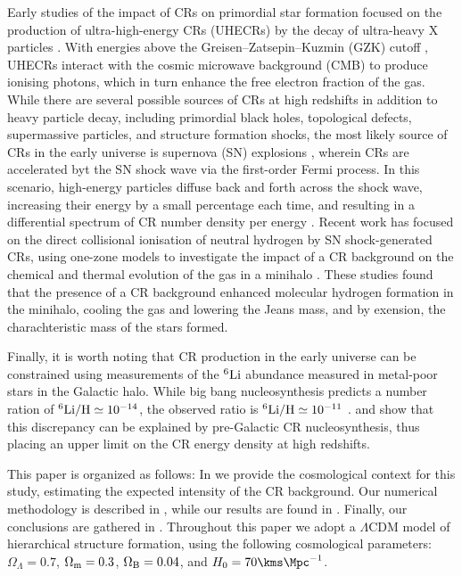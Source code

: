 Early studies of the impact of CRs on primordial star formation focused on the production of ultra-high-energy CRs (UHECRs) by the decay of ultra-heavy X particles \citep{ShchekinovVasiliev2004,VasilievShchekinov2006,RipamontiMapelliFerrara2007}.  With energies above the Greisen--Zatsepin--Kuzmin (GZK) cutoff \citep{Greisen1966,ZatsepinKuzmin1966}, UHECRs interact with the cosmic microwave background (CMB) to produce ionising photons, which in turn enhance the free electron fraction of the gas.  
While there are several possible sources of CRs at high redshifts in addition to heavy particle decay, including primordial black holes, topological defects, supermassive particles, and structure formation shocks, the most likely source of CRs in the early universe is supernova (SN) explosions \citep[e.g.,][]{GinzburgSyrovatskii1969,BiermannSigl2001,Stanev2004,Pfrommeretal2006}, wherein CRs are accelerated byt the SN shock wave via the first-order Fermi process.  In this scenario, high-energy particles diffuse back and forth across the shock wave, increasing their energy by a small percentage each time, and resulting in a differential spectrum of CR number density per energy \citep{Longair1994}.
Recent work has focused on the direct collisional ionisation of neutral hydrogen by SN shock-generated CRs, using one-zone models to investigate the impact of a CR background on the chemical and thermal evolution of the gas in a minihalo \citep{StacyBromm2007,JascheCiardiEnsslin2007}.  These studies found that the presence of a CR background enhanced molecular hydrogen formation in the minihalo, cooling the gas and lowering the Jeans mass, and by exension, the charachteristic mass of the stars formed. 

Finally, it is worth noting that CR production in the early universe can be constrained using measurements of the $^6{\rm Li}$ abundance measured in metal-poor stars in the Galactic halo.  While big bang nucleosynthesis  predicts a number ration of $^6{\rm Li/H} \simeq 10^{-14}$, the observed  ratio is   $^6{\rm Li/H} \simeq 10^{-11}$ \citep{Asplundetal2006}. \citet{RollindeVangioniOlive2005} and \citet{RollindeVangioniOlive2006} show that this discrepancy can be explained by pre-Galactic CR nucleosynthesis, thus placing an upper limit on the CR energy density at high redshifts.


This paper is organized as follows: In  we provide the cosmological context for this study, estimating the expected intensity of the CR background. Our numerical methodology is described in , while our results are found in .  Finally, our conclusions are gathered in . Throughout this paper we adopt a $\Lambda$CDM model of hierarchical structure formation, using the following cosmological parameters: $\Omega_{\Lambda} = 0.7$, $\Omega_{\rm m} = 0.3$, $\Omega_{\rm B} = 0.04$, and $H_0 = 70 \kms \Mpc^{-1}$.